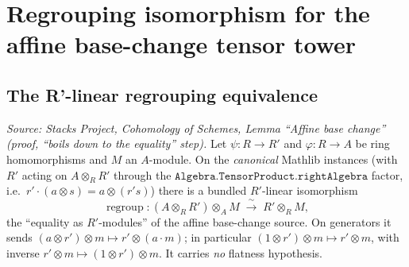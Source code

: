 \chapter{Regrouping isomorphism for the affine base-change tensor tower}
\label{chap:Cohomology_RegroupHelper}

\section{The R'-linear regrouping equivalence}

\begin{lemma}

  \label{lem:base_change_regroup_linearEquiv}
  \textit{Source: Stacks Project, Cohomology of Schemes, Lemma ``Affine base
  change'' (proof, ``boils down to the equality'' step).}
  Let \(\psi : R \to R'\) and \(\varphi : R \to A\) be ring homomorphisms and \(M\)
  an \(A\)-module. On the \emph{canonical} Mathlib instances (with \(R'\) acting on
  \(A \otimes_R R'\) through the \(\texttt{Algebra.TensorProduct.rightAlgebra}\)
  factor, i.e.\ \(r' \cdot (a \otimes s) = a \otimes (r' s)\)) there is a bundled
  \(R'\)-linear isomorphism
  \[
    \operatorname{regroup} :
    (A \otimes_R R') \otimes_A M \;\xrightarrow{\ \sim\ }\; R' \otimes_R M ,
  \]
  the ``equality as \(R'\)-modules'' of the affine base-change source. On generators
  it sends \((a \otimes r') \otimes m \mapsto r' \otimes (a \cdot m)\); in
  particular \((1 \otimes r') \otimes m \mapsto r' \otimes m\), with inverse
  \(r' \otimes m \mapsto (1 \otimes r') \otimes m\). It carries \emph{no} flatness
  hypothesis.
\end{lemma}

